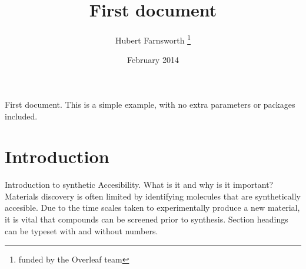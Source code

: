\documentclass{article}
\title{First document}
\author{Hubert Farnsworth \thanks{funded by the Overleaf team}}
\date{February 2014}
\begin{document}
First document. This is a simple example, with no 
extra parameters or packages included.
\section{Introduction}
Introduction to synthetic Accesibility.
What is it and why is it important?
Materials discovery is often limited by identifying molecules that are synthetically accesible. Due to the time scales taken to experimentally produce a new material,
it is vital that compounds can be screened prior to synthesis.
Section headings can be typeset with and without numbers.\cite{Abernethy2003}
\end{document}
